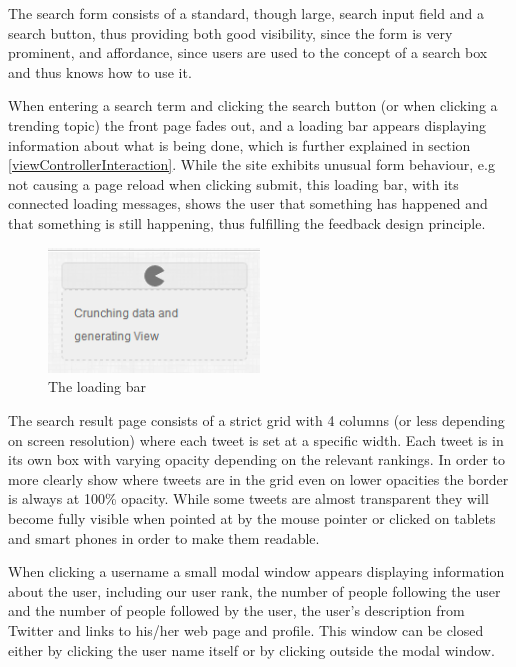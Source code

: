The search form consists of a standard, though large, search input field and a search button, thus providing both good visibility, since the form is very prominent, and affordance, since users are used to the concept of a search box and thus knows how to use it.

When entering a search term and clicking the search button (or when clicking a trending topic) the front page fades out, and a loading bar appears displaying information about what is being done, which is further explained in section \ref{viewControllerInteraction}. While the site exhibits unusual form behaviour, e.g not causing a page reload when clicking submit, this loading bar, with its connected loading messages, shows the user that something has happened and that something is still happening, thus fulfilling the feedback design principle.

\begin{figure}[ht]
    \begin{minipage}[b]{1\linewidth}
        \centering
        \includegraphics[width=0.5\textwidth]{figures/feedjam_loading}
        \caption{The loading bar}
        \label{fig:FeedJamLoading}
    \end{minipage}
\end{figure}


The search result page consists of a strict grid with 4 columns (or less depending on screen resolution) where each tweet is set at a specific width. Each tweet is in its own box with varying opacity depending on the relevant rankings. In order to more clearly show where tweets are in the grid even on lower opacities the border is always at 100\% opacity. While some tweets are almost transparent they will become fully visible when pointed at by the mouse pointer or clicked on tablets and smart phones in order to make them readable.

When clicking a username a small modal window appears displaying information about the user, including our user rank, the number of people following the user and the number of people followed by the user, the user's description from Twitter and links to his/her web page and profile. This window can be closed either by clicking the user name itself or by clicking outside the modal window.

